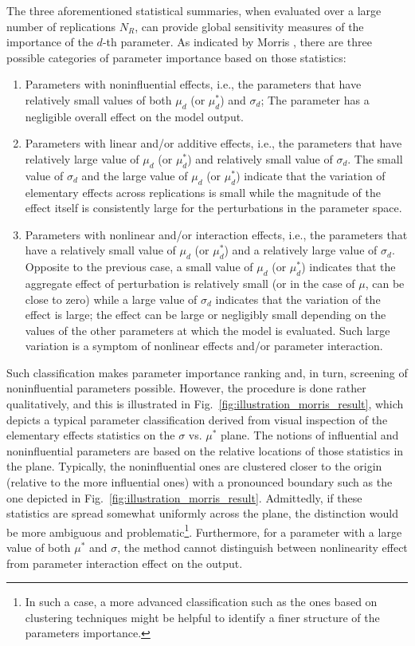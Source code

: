 The three aforementioned statistical summaries, when evaluated over a large number of replications $N_R$,
can provide global sensitivity measures of the importance of the $d$-th parameter.
As indicated by Morris \cite{Morris1991}, there are three possible categories of parameter importance based on those statistics:
\begin{enumerate}
	\item Parameters with noninfluential effects, i.e., the parameters that have relatively small values of both $\mu_d$ (or $\mu^*_d$) and $\sigma_d$;
	The parameter has a negligible overall effect on the model output.
	\item Parameters with linear and/or additive effects, i.e., the parameters that have relatively large value of $\mu_d$ (or $\mu^*_d$) and relatively small value of $\sigma_d$.
	The small value of $\sigma_d$ and the large value of $\mu_d$ (or $\mu^*_d$) indicate that the variation of elementary effects across replications is small while the magnitude of the effect itself is consistently large for the perturbations in the parameter space.
	\item Parameters with nonlinear and/or interaction effects, i.e., the parameters that have a relatively small value of $\mu_d$ (or $\mu^*_d$) and a relatively large value of $\sigma_d$.
	Opposite to the previous case, a small value of $\mu_d$ (or $\mu^*_d$) indicates that the aggregate effect of perturbation is relatively small (or in the case of $\mu$, can be close to zero) while a large value of $\sigma_d$ indicates that the variation of the effect is large; the effect can be large or negligibly small depending on the values of the other parameters at which the model is evaluated.
	Such large variation is a symptom of nonlinear effects and/or parameter interaction.
\end{enumerate}

Such classification makes parameter importance ranking and, in turn, screening of noninfluential parameters possible.
However, the procedure is done rather qualitatively, and this is illustrated in Fig.~\ref{fig:illustration_morris_result}, 
which depicts a typical parameter classification derived from visual inspection of the elementary effects statistics on the $\sigma$ vs. $\mu^*$ plane.
The notions of influential and noninfluential parameters are based on the relative locations of those statistics in the plane.
Typically, the noninfluential ones are clustered closer to the origin (relative to the more influential ones) with a pronounced boundary such as the one depicted in Fig.~\ref{fig:illustration_morris_result}. 
Admittedly, if these statistics are spread somewhat uniformly across the plane, 
the distinction would be more ambiguous and problematic\footnote{In such a case, a more advanced classification such as the ones based on clustering techniques might be helpful to identify a finer structure of the parameters importance.}.
Furthermore, for a parameter with a large value of both $\mu^*$ and $\sigma$,
the method cannot distinguish between nonlinearity effect from parameter interaction effect on the output.

